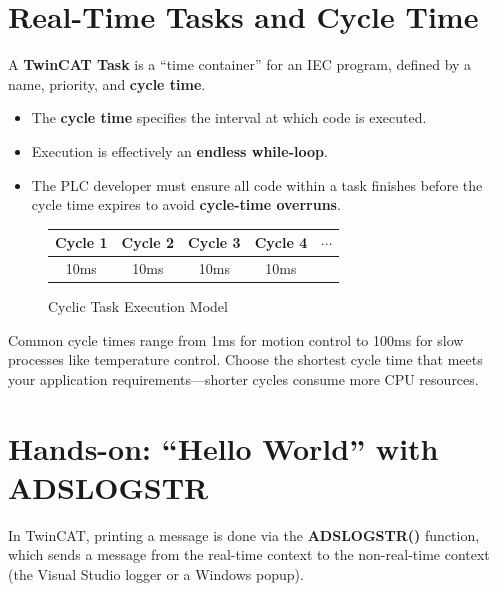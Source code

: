 \documentclass[11pt,a4paper]{article}
\begin{document}
\section{Real-Time Tasks and Cycle Time}

A \textbf{TwinCAT Task} is a ``time container'' for an IEC program, defined by a name, priority, and \textbf{cycle time}.

\begin{itemize}[leftmargin=*]
    \item The \textbf{cycle time} specifies the interval at which code is executed.
    \item Execution is effectively an \textbf{endless while-loop}.
    \item The PLC developer must ensure all code within a task finishes before the cycle time expires to avoid \textbf{cycle-time overruns}.
\end{itemize}

\begin{figure}[h]
\centering
\begin{tabular}{|c|c|c|c|c|}
\hline
Cycle 1 & Cycle 2 & Cycle 3 & Cycle 4 & $\cdots$ \\
\hline
10ms & 10ms & 10ms & 10ms & \\
\hline
\end{tabular}
\caption{Cyclic Task Execution Model}
\end{figure}

\begin{notebox}
Common cycle times range from 1ms for motion control to 100ms for slow processes like temperature control. Choose the shortest cycle time that meets your application requirements---shorter cycles consume more CPU resources.
\end{notebox}

\section{Hands-on: ``Hello World'' with ADSLOGSTR}

In TwinCAT, printing a message is done via the \textbf{ADSLOGSTR()} function, which sends a message from the real-time context to the non-real-time context (the Visual Studio logger or a Windows popup).
\end{document}
